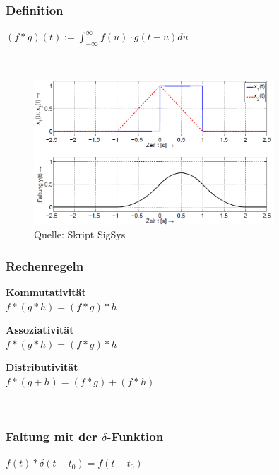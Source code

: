 \subsubsection[Definition]{Definition}
\begin{minipage}{0.4\textwidth}
		\begin{framed}
			\centering
			$(f * g)(t):=\int_{-\infty}^{\infty} f(u) \cdot g(t-u) d u$
		\end{framed}
\end{minipage}\\
%
\begin{figure}[h]
	\centering
	\includegraphics[width=0.8\textwidth]{Bilder/Faltung.png}
	\caption{Quelle: Skript SigSys}
\end{figure}
%
\subsubsection[Rechenregeln]{Rechenregeln}
	\begin{minipage}{0.33\textwidth}
		\textbf{Kommutativität}\\
		$f *(g * h)=(f * g) * h$
	\end{minipage}
%
	\begin{minipage}{0.33\textwidth}
		\textbf{Assoziativität}\\
		$f *(g * h)=(f * g) * h$
	\end{minipage}
%
	\begin{minipage}{0.33\textwidth}
		\textbf{Distributivität}\\
		$f *(g+h)=(f * g)+(f * h)$
	\end{minipage}\\
%
\subsubsection[Faltung mit der $\delta$-Funktion]{Faltung mit der $\delta$-Funktion}
\begin{minipage}{0.5\textwidth}
	$f(t) * \delta\left(t-t_{0}\right)=f\left(t-t_{0}\right)$
\end{minipage}\\
%
